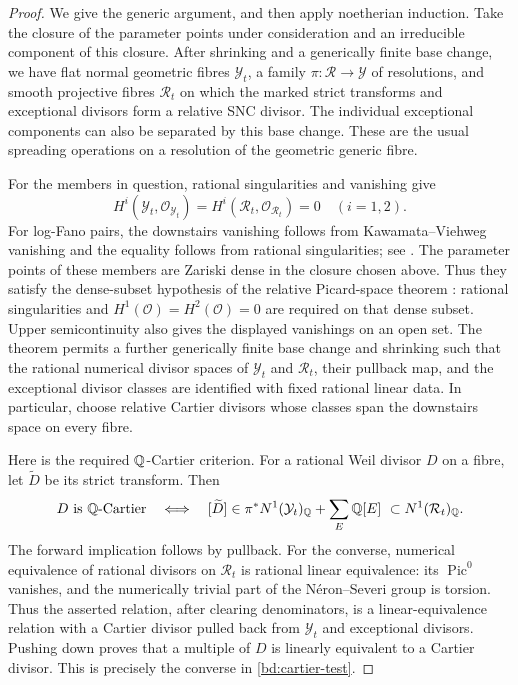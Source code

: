 \begin{proof}
We give the generic argument, and then apply noetherian induction.
Take the closure of the parameter points under consideration and an
irreducible component of this closure.  After shrinking and a
generically finite base change, we have flat normal geometric fibres
$\mathcal Y_t$, a family $\pi:\mathcal R\to\mathcal Y$ of resolutions,
and smooth projective fibres $\mathcal R_t$ on which the marked strict
transforms and exceptional divisors form a relative SNC divisor.
The individual exceptional components can also be separated by this
base change.  These are the usual spreading operations on a resolution
of the geometric generic fibre.

For the members in question, rational singularities and vanishing
give
\[
 H^i(\mathcal Y_t,\mathcal O_{\mathcal Y_t})
 =H^i(\mathcal R_t,\mathcal O_{\mathcal R_t})=0\quad(i=1,2).
\]
For log-Fano pairs, the downstairs vanishing follows from
Kawamata--Viehweg vanishing and the equality follows from rational
singularities; see
\cite[Theorem~3.13.1 and Corollary~5.7.7]{FujinoFoundationsDraft057}.
The parameter points of these members are Zariski dense in the
closure chosen above. Thus they satisfy the dense-subset hypothesis
of the relative Picard-space theorem \cite[Theorem~1.3]{CLZ26}:
rational singularities and $H^1(\mathcal O)=H^2(\mathcal O)=0$
are required on that dense subset. Upper semicontinuity also gives
the displayed vanishings on an open set. The theorem permits a further generically finite
base change and shrinking such that the rational numerical divisor
spaces of $\mathcal Y_t$ and $\mathcal R_t$, their pullback map, and
the exceptional divisor classes are identified with fixed rational
linear data.  In particular, choose relative Cartier divisors whose
classes span the downstairs space on every fibre.

Here is the required $\mathbb Q$-Cartier criterion.  For a rational Weil
divisor $D$ on a fibre, let $\widetilde D$ be its strict transform.
Then
\begin{equation}\label{bd:cartier-test}
 D\text{ is }\mathbb Q\text{-Cartier}
 \quad\Longleftrightarrow\quad
 [\widetilde D]\in
 \pi^*N^1(\mathcal Y_t)_{\mathbb Q}
       +\sum_E\mathbb Q[E]\ \subset N^1(\mathcal R_t)_{\mathbb Q}.
\end{equation}
The forward implication follows by pullback.  For the converse,
numerical equivalence of rational divisors on $\mathcal R_t$ is
rational linear equivalence: its $\operatorname{Pic}^0$ vanishes,
and the numerically trivial part of the N\'eron--Severi group is
torsion.  Thus the asserted relation, after clearing denominators,
is a linear-equivalence relation with a Cartier divisor pulled back
from $\mathcal Y_t$ and exceptional divisors.  Pushing down proves
that a multiple of $D$ is linearly equivalent to a Cartier divisor.
This is precisely the converse in \eqref{bd:cartier-test}.


\end{proof}
